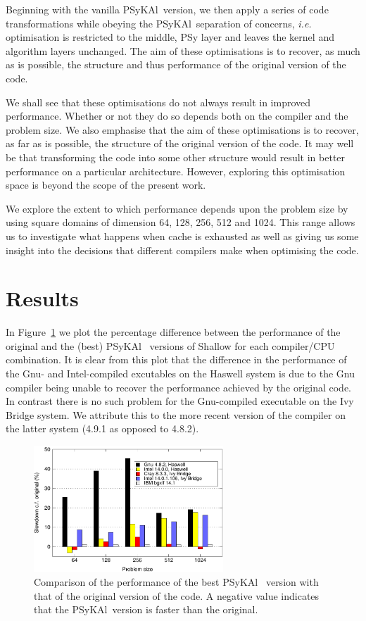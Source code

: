 \documentclass{IOS-Book-Article}
\newcommand{\psykal}{{PS}y{KA}l\ }
\begin{document}
Beginning with the vanilla \psykal version, we then apply a series of
code transformations while obeying the \psykal separation of concerns,
{\it i.e.} optimisation is restricted to the middle, {PS}y layer and
leaves the kernel and algorithm layers unchanged. The aim of these
optimisations is to recover, as much as is possible, the structure and
thus performance of the original version of the code.

We shall see that these optimisations do not always result in improved
performance. Whether or not they do so depends both on the compiler
and the problem size. We also emphasise that the aim of these
optimisations is to recover, as far as is possible, the structure of
the original version of the code. It may well be that transforming the
code into some other structure would result in better performance on a
particular architecture. However, exploring this optimisation space is
beyond the scope of the present work.

We explore the extent to which performance depends upon the problem
size by using square domains of dimension 64, 128, 256, 512 and
1024. This range allows us to investigate what happens when cache is
exhausted as well as giving us some insight into the decisions that
different compilers make when optimising the code.

\section{Results}

In Figure~\ref{FIG_slowdown_summary} we plot the percentage difference
between the performance of the original and the (best) \psykal
versions of Shallow for each compiler/CPU combination.  It is clear
from this plot that the difference in the performance of the Gnu- and
Intel-compiled excutables on the Haswell system is due to the Gnu
compiler being unable to recover the performance achieved by the
original code. In contrast there is no such problem for the
Gnu-compiled executable on the Ivy Bridge system. We attribute this to
the more recent version of the compiler on the latter system (4.9.1 as
opposed to 4.8.2).

\begin{figure}[!t]
\centering
\includegraphics[width=2.8in]{../slowdown_summary}
\caption{Comparison of the performance of the best \psykal
version with that of the original version of the code. A negative value 
indicates that the \psykal version is faster than the original.}
\label{FIG_slowdown_summary}
\end{figure}
\end{document}
